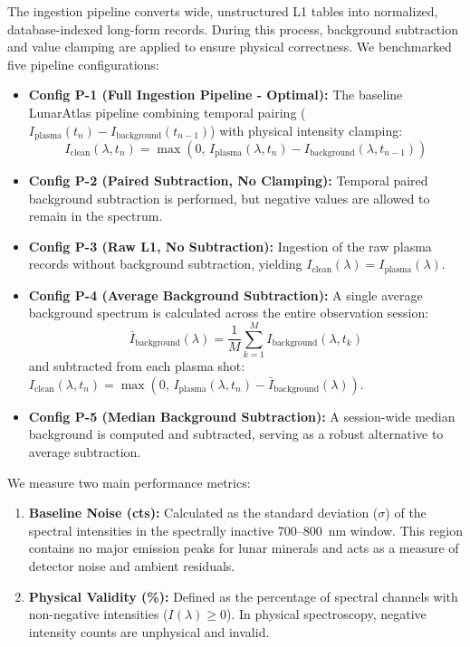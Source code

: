 The ingestion pipeline converts wide, unstructured L1 tables into normalized, database-indexed long-form records. During this process, background subtraction and value clamping are applied to ensure physical correctness. We benchmarked five pipeline configurations:
\begin{itemize}
    \item \textbf{Config P-1 (Full Ingestion Pipeline - Optimal):} The baseline LunarAtlas pipeline combining temporal pairing ($I_{\text{plasma}}(t_n) - I_{\text{background}}(t_{n-1})$) with physical intensity clamping:
    \begin{equation}
        I_{\text{clean}}(\lambda, t_n) = \max\left(0,\, I_{\text{plasma}}(\lambda, t_n) - I_{\text{background}}(\lambda, t_{n-1})\right)
    \end{equation}
    \item \textbf{Config P-2 (Paired Subtraction, No Clamping):} Temporal paired background subtraction is performed, but negative values are allowed to remain in the spectrum.
    \item \textbf{Config P-3 (Raw L1, No Subtraction):} Ingestion of the raw plasma records without background subtraction, yielding $I_{\text{clean}}(\lambda) = I_{\text{plasma}}(\lambda)$.
    \item \textbf{Config P-4 (Average Background Subtraction):} A single average background spectrum is calculated across the entire observation session:
    \begin{equation}
        \bar{I}_{\text{background}}(\lambda) = \frac{1}{M}\sum_{k=1}^{M} I_{\text{background}}(\lambda, t_k)
    \end{equation}
    and subtracted from each plasma shot: $I_{\text{clean}}(\lambda, t_n) = \max\left(0,\, I_{\text{plasma}}(\lambda, t_n) - \bar{I}_{\text{background}}(\lambda)\right)$.
    \item \textbf{Config P-5 (Median Background Subtraction):} A session-wide median background is computed and subtracted, serving as a robust alternative to average subtraction.
\end{itemize}

We measure two main performance metrics:
\begin{enumerate}
    \item \textbf{Baseline Noise (cts):} Calculated as the standard deviation ($\sigma$) of the spectral intensities in the spectrally inactive 700--800~nm window. This region contains no major emission peaks for lunar minerals and acts as a measure of detector noise and ambient residuals.
    \item \textbf{Physical Validity (\%):} Defined as the percentage of spectral channels with non-negative intensities ($I(\lambda) \ge 0$). In physical spectroscopy, negative intensity counts are unphysical and invalid.
\end{enumerate}

